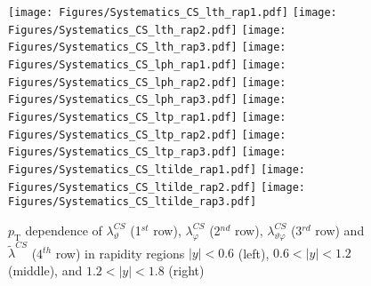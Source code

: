 \documentclass[12pt]{article}
\newcommand{\pT}{p_\mathrm{T}}
\newcommand{\absy}{\left |  y \right |}
\newcommand{\lamthCS}{\lambda^{\scriptscriptstyle CS}_\vartheta}
\newcommand{\lamphCS}{\lambda^{\scriptscriptstyle CS}_\varphi}
\newcommand{\lamthphCS}{\lambda^{\scriptscriptstyle CS}_{\vartheta \varphi}}
\newcommand{\lamtildeCS}{\tilde{\lambda}^{\scriptscriptstyle CS}}
\begin{document}



\begin{figure}[htbp]
\centering
\texttt{[image: Figures/Systematics\_CS\_lth\_rap1.pdf]}
\texttt{[image: Figures/Systematics\_CS\_lth\_rap2.pdf]}
\texttt{[image: Figures/Systematics\_CS\_lth\_rap3.pdf]}
\texttt{[image: Figures/Systematics\_CS\_lph\_rap1.pdf]}
\texttt{[image: Figures/Systematics\_CS\_lph\_rap2.pdf]}
\texttt{[image: Figures/Systematics\_CS\_lph\_rap3.pdf]}
\texttt{[image: Figures/Systematics\_CS\_ltp\_rap1.pdf]}
\texttt{[image: Figures/Systematics\_CS\_ltp\_rap2.pdf]}
\texttt{[image: Figures/Systematics\_CS\_ltp\_rap3.pdf]}
\texttt{[image: Figures/Systematics\_CS\_ltilde\_rap1.pdf]}
\texttt{[image: Figures/Systematics\_CS\_ltilde\_rap2.pdf]}
\texttt{[image: Figures/Systematics\_CS\_ltilde\_rap3.pdf]}
\caption{$\pT$ dependence of $\lamthCS$
(1$^{st}$ row), $\lamphCS$ (2$^{nd}$ row), $\lamthphCS$ (3$^{rd}$ row) and 
$\lamtildeCS$ (4$^{th}$ row) in rapidity regions $\absy<0.6$ (left), 
$0.6<\absy<1.2$ (middle), and $1.2<\absy<1.8$ (right)}
\end{figure}
\clearpage
\end{document}

